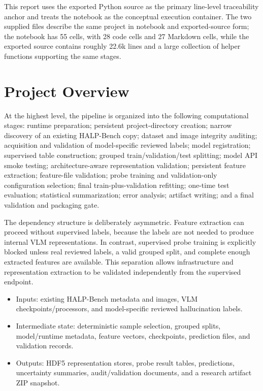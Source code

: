 \documentclass[11pt,a4paper]{article}
\begin{document}
This report uses the exported Python source as the primary line-level traceability anchor and treats the notebook as the conceptual execution container. The two supplied files describe the same project in notebook and exported-source form; the notebook has 55 cells, with 28 code cells and 27 Markdown cells, while the exported source contains roughly 22.6k lines and a large collection of helper functions supporting the same stages.

\section{Project Overview}

At the highest level, the pipeline is organized into the following computational stages: runtime preparation; persistent project-directory creation; narrow discovery of an existing HALP-Bench copy; dataset and image integrity auditing; acquisition and validation of model-specific reviewed labels; model registration; supervised table construction; grouped train/validation/test splitting; model API smoke testing; architecture-aware representation validation; persistent feature extraction; feature-file validation; probe training and validation-only configuration selection; final train-plus-validation refitting; one-time test evaluation; statistical summarization; error analysis; artifact writing; and a final validation and packaging gate.

The dependency structure is deliberately asymmetric. Feature extraction can proceed without supervised labels, because the labels are not needed to produce internal VLM representations. In contrast, supervised probe training is explicitly blocked unless real reviewed labels, a valid grouped split, and complete enough extracted features are available. This separation allows infrastructure and representation extraction to be validated independently from the supervised endpoint.

\begin{itemize}

\item Inputs: existing HALP-Bench metadata and images, VLM checkpoints/processors, and model-specific reviewed hallucination labels.

\item Intermediate state: deterministic sample selection, grouped splits, model/runtime metadata, feature vectors, checkpoints, prediction files, and validation records.

\item Outputs: HDF5 representation stores, probe result tables, predictions, uncertainty summaries, audit/validation documents, and a research artifact ZIP snapshot.

\end{itemize}
\end{document}
